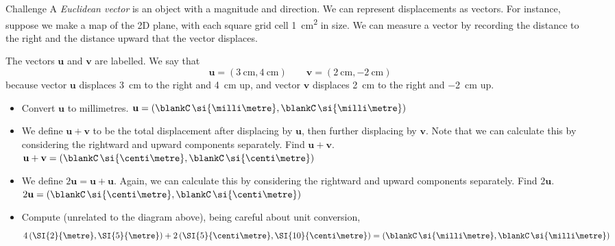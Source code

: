 \documentclass[14pt,letterpaper]{article}
\begin{document}
\begin{problem}{Challenge}
  A \emph{Euclidean vector} is an object with a magnitude and direction. We can
  represent displacements as vectors. For instance, suppose we make a map of
  the 2D plane, with each square grid cell \SI{1}{\centi\metre\squared} in
  size. We can measure a vector by recording the distance to the right and the
  distance upward that the vector displaces.

  \begin{center}
  \end{center}

  The vectors \(\mathbf{u}\) and \(\mathbf{v}\) are labelled. We say that \[
    \mathbf{u} = \left( \SI{3}{\centi\metre}, \SI{4}{\centi\metre} \right)
    \hspace{2em}
    \mathbf{v} = \left( \SI{2}{\centi\metre}, \SI{-2}{\centi\metre} \right)
  \] because vector \(\mathbf{u}\) displaces \SI{3}{\centi\metre} to the right
  and \SI{4}{\centi\metre} up, and vector \(\mathbf{v}\) displaces
  \SI{2}{\centi\metre} to the right and \SI{-2}{\centi\metre} up.

  \begin{itemize}
    \item Convert \(\mathbf{u}\) to millimetres. \hfill
    \(\mathbf{u} = \left(
    \blankC\,\si{\milli\metre}, \blankC\,\si{\milli\metre} \right)\)
    \item We define \(\mathbf{u} + \mathbf{v}\) to be the total displacement
    after displacing by \(\mathbf{u}\), then further displacing by
    \(\mathbf{v}\). Note that we can calculate this by considering the
    rightward and upward components separately. Find \(\mathbf{u} +
    \mathbf{v}\). \hfill \(\mathbf{u} + \mathbf{v} = \left(
    \blankC\,\si{\centi\metre}, \blankC\,\si{\centi\metre} \right)\)
    \item We define \(2\mathbf{u} = \mathbf{u} + \mathbf{u}\). Again, we can
    calculate this by considering the rightward and upward components
    separately. Find \(2\mathbf{u}\). \hfill \(2\mathbf{u} = \left(
    \blankC\,\si{\centi\metre}, \blankC\,\si{\centi\metre} \right)\)
    \item Compute (unrelated to the diagram above), being careful about unit
    conversion, \[
      4\left( \SI{2}{\metre}, \SI{5}{\metre} \right) +
      2\left( \SI{5}{\centi\metre}, \SI{10}{\centi\metre} \right)
      = \left( \blankC\,\si{\milli\metre}, \blankC\,\si{\milli\metre} \right)
    \]
  \end{itemize}
\end{problem}
\end{document}
